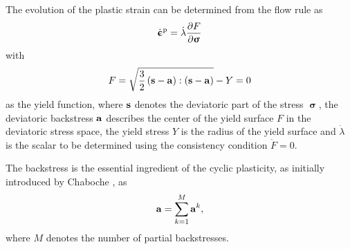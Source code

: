 \documentclass[preprint,5p,twocolumn,11pt,sort&compress]{elsarticle}
\newcommand{\bfsigma}{{\bm{\upsigma}}}
\newcommand{\dotbfepsilon}{{\dot{\bm{\upepsilon}}}}
\newcommand{\bfa}{{\bf a}}
\newcommand{\bfs}{{\bf s}}
\begin{document}
The evolution of the plastic strain can be determined from the flow rule as
\begin{equation}
{\dotbfepsilon}^{\rm p} = \dot \lambda \frac{{\partial F}}{{\partial {\bfsigma}}}
\end{equation}
with
\begin{equation}
F = \sqrt {\frac{3}{2}\left( {\bfs - \bfa} \right):\left( {\bfs - \bfa} \right)}  - Y=0
\end{equation}
as the yield function, where $\bfs$ denotes the deviatoric part of the stress ${\bfsigma}$, the deviatoric backstress $\bfa$ describes the center of the yield surface $F$ in the deviatoric stress space, the yield stress $Y$ is the radius of the yield surface and $\dot \lambda$ is the scalar to be determined using the consistency condition $\dot F = 0$.

The backstress is the essential ingredient of the cyclic plasticity, as initially introduced by Chaboche \cite{Chaboche1986149}, as
\begin{equation}
\bfa = \sum\limits_{k = 1}^M {{\bfa^k}},
\end{equation}
where $M$ denotes the number of partial backstresses.
\end{document}
